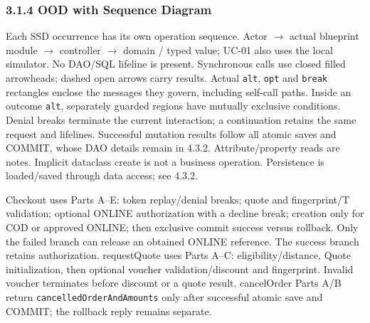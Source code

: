 \subsubsection*{3.1.4 OOD with Sequence Diagram}
Each SSD occurrence has its own operation sequence. Actor \ensuremath{\rightarrow} actual blueprint module \ensuremath{\rightarrow} controller \ensuremath{\rightarrow} domain / typed value; UC-01 also uses the local simulator. No DAO/SQL lifeline is present. Synchronous calls use closed filled arrowheads; dashed open arrows carry results. Actual \texttt{alt}, \texttt{opt} and \texttt{break} rectangles enclose the messages they govern, including self-call paths. Inside an outcome \texttt{alt}, separately guarded regions have mutually exclusive conditions. Denial breaks terminate the current interaction; a continuation retains the same request and lifelines. Successful mutation results follow all atomic saves and COMMIT, whose DAO details remain in 4.3.2. Attribute/property reads are notes. Implicit dataclass \guillemotleft{}create\guillemotright{} is not a business operation. Persistence is loaded/saved through data access; see 4.3.2.

Checkout uses Parts A--E: token replay/denial breaks; quote and fingerprint/T validation; optional ONLINE authorization with a decline break; creation only for COD or approved ONLINE; then exclusive commit success versus rollback. Only the failed branch can release an obtained ONLINE reference. The success branch retains authorization. requestQuote uses Parts A--C: eligibility/distance, Quote initialization, then optional voucher validation/discount and fingerprint. Invalid voucher terminates before discount or a quote result. cancelOrder Parts A/B return \texttt{cancelledOrderAndAmounts} only after successful atomic save and COMMIT; the rollback reply remains separate.

